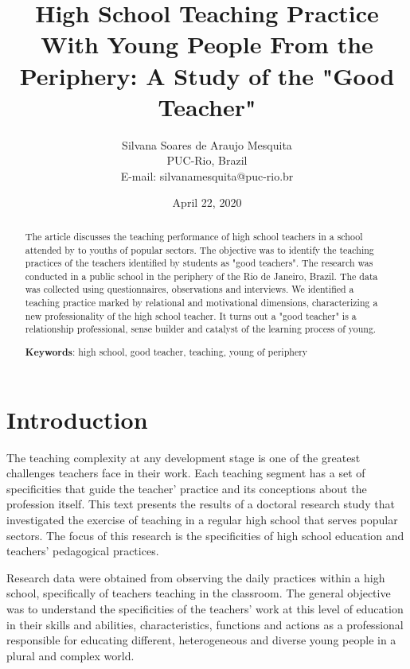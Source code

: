 \documentclass[11pt, a4paper]{article}
\title{High School Teaching Practice With Young People From the Periphery:
A Study of the "Good Teacher"}
\author{
    Silvana Soares de Araujo Mesquita \\
    PUC-Rio, Brazil \\
    E-mail: silvanamesquita@puc-rio.br
}
\date{April 22, 2020}
\begin{document}
\maketitle

\begin{abstract}
    The article discusses the teaching performance of high school teachers in a school attended by to youths of popular
    sectors. The objective was to identify the teaching practices of the teachers identified by students as "good teachers".
    The research was conducted in a public school in the periphery of the Rio de Janeiro, Brazil. The data was collected
    using questionnaires, observations and interviews. We identified a teaching practice marked by relational and
    motivational dimensions, characterizing a new professionality of the high school teacher. It turns out a "good teacher" is
    a relationship professional, sense builder and catalyst of the learning process of young.

    \begin{center}
        \textbf{Keywords}: high school, good teacher, teaching, young of periphery
    \end{center}

\end{abstract}

\section{Introduction}

The teaching complexity at any development stage is one of the greatest challenges teachers face in their work. Each
teaching segment has a set of specificities that guide the teacher' practice and its conceptions about the profession itself.
This text presents the results of a doctoral research study that investigated the exercise of teaching in a regular high school
that serves popular sectors. The focus of this research is the specificities of high school education and teachers'
pedagogical practices.

Research data were obtained from observing the daily practices within a high school, specifically of teachers teaching in
the classroom. The general objective was to understand the specificities of the teachers' work at this level of education in
their skills and abilities, characteristics, functions and actions as a professional responsible for educating different,
heterogeneous and diverse young people in a plural and complex world.
\end{document}
